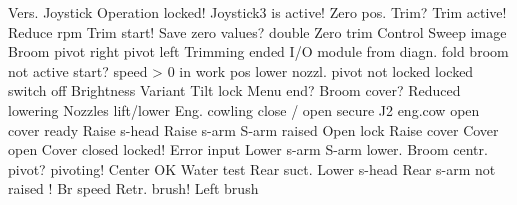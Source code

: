 %
 {Vers.}
 {Joystick}
 {Operation}
 {locked!}
 {Joystick3}
 {is active!}
 {Zero pos.}
 {Trim?}
 {Trim active!}
 {Reduce rpm}
 {Trim start!}
 {Save}
 {zero values?}
 {double}
 {Zero trim}
 {Control}
 {Sweep image}
 {Broom}
 {pivot right}
 {pivot left}
 {Trimming}
 {ended}
 {I/O module}
 {from diagn.}
 {fold broom}
 {not active}
 {start?}
 {speed > 0}
 {in work pos}
 {lower nozzl.}
 {pivot}
 {not locked}
 {locked}
 {switch off}
 {Brightness}
 {Variant}
 {Tilt lock}
 {Menu end?}
 {Broom cover?}
 {Reduced}
 {lowering}
 {Nozzles}
 {lift/lower}
 {Eng. cowling}
 {close / open}
 {secure}
 {J2 eng.cow}
 {open cover}
 {ready}
 {Raise s-head}
 {Raise s-arm}
 {S-arm raised}
 {Open lock}
 {Raise cover}
 {Cover open}
 {Cover closed}
 {locked!}
 {Error input}
 {Lower s-arm}
 {S-arm lower.}
 {Broom centr.}
 {pivot?}
 {pivoting!}
 {Center OK}
 {Water test}
 {Rear suct.}
 {Lower s-head}
 {Rear s-arm}
 {not raised !}
 {Br speed}
 {Retr. brush!}
 {Left brush}
